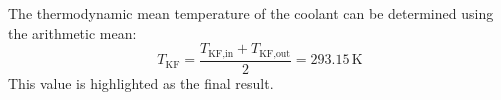 The thermodynamic mean temperature of the coolant can be determined using the arithmetic mean:  
\[
T_{\text{KF}} = \frac{T_{\text{KF,in}} + T_{\text{KF,out}}}{2} = 293.15 \, \text{K}
\]  
This value is highlighted as the final result.